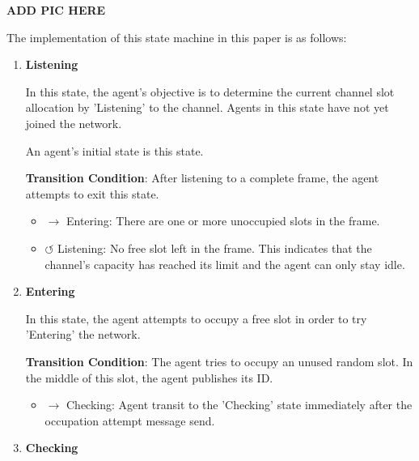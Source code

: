 \textbf{ADD PIC HERE} %

The implementation of this state machine in this paper is as follows:

\begin{enumerate}
    \item \textbf{Listening}
    

    In this state, the agent's objective is to determine the current channel slot allocation by 'Listening' to the channel. 
    Agents in this state have not yet joined the network.

    An agent's initial state is this state.

    \textbf{Transition Condition}: After listening to a complete frame, the agent attempts to exit this state.
    \begin{itemize}
        \item $\rightarrow$ Entering: There are one or more unoccupied slots in the frame.
        \item $\circlearrowleft$ Listening: No free slot left in the frame. This indicates that the channel's capacity has reached its limit and the agent can only stay idle.
    \end{itemize}
    
    \item \textbf{Entering}
    
    In this state, the agent attempts to occupy a free slot in order to try 'Entering' the network.

    \textbf{Transition Condition}: 
    The agent tries to occupy an unused random slot. In the middle of this slot, the agent publishes its ID.

    \begin{itemize}
        \item $\rightarrow$ Checking: Agent transit to the 'Checking' state immediately after the occupation attempt message send.
    \end{itemize}


    \item \textbf{Checking}
    

\end{enumerate}
